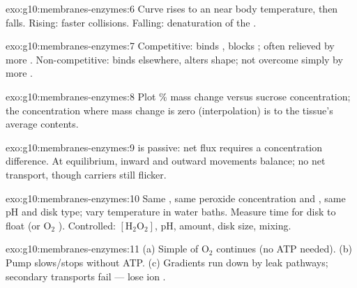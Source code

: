 \begin{solution}{exo:g10:membranes-enzymes:6}
Curve rises to an  near body temperature, then falls. Rising:
faster collisions. Falling: denaturation of the .
\end{solution}

\begin{solution}{exo:g10:membranes-enzymes:7}
Competitive: binds , blocks ; often relieved by more
. Non-competitive: binds elsewhere, alters shape; not overcome
simply by more .
\end{solution}

\begin{solution}{exo:g10:membranes-enzymes:8}
Plot $\%$ mass change versus sucrose concentration; the concentration
where mass change is zero (interpolation) is  to the tissue's
average  contents.
\end{solution}

\begin{solution}{exo:g10:membranes-enzymes:9}
 is passive: net flux requires a concentration
difference. At equilibrium, inward and outward movements balance; no net
transport, though carriers still flicker.
\end{solution}

\begin{solution}{exo:g10:membranes-enzymes:10}
Same  , same peroxide concentration and , same pH and
disk type; vary temperature in water baths. Measure time for disk to
float (or $\mathrm{O_2}$ ). Controlled: $[\mathrm{H_2O_2}]$, pH,
 amount, disk size, mixing.
\end{solution}

\begin{solution}{exo:g10:membranes-enzymes:11}
(a) Simple  of $\mathrm{O_2}$ continues (no ATP needed).
(b) Pump slows/stops without ATP. (c) Gradients run down by leak pathways;
secondary transports fail ---  lose ion .
\end{solution}

